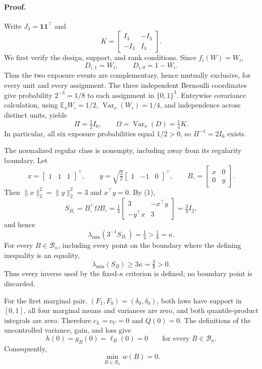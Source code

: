 \paragraph{Proof.}
Write \(J_3=\mathbf 1\mathbf 1^{\top}\) and
\[
K=\begin{bmatrix}I_3&-I_3\\-I_3&I_3\end{bmatrix}.
\]
We first verify the design, support, and rank conditions.  Since \(f_i(W)=W_i\),
\[
D_{i,1}=W_i,
\qquad
D_{i,0}=1-W_i.
\]
Thus the two exposure events are complementary, hence mutually exclusive, for every unit and every assignment.  The three independent Bernoulli coordinates give probability \(2^{-3}=1/8\) to each assignment in \(\{0,1\}^3\).  Entrywise covariance calculation, using \(\mathbb E_\nu W_i=1/2\), \(\operatorname{Var}_\nu(W_i)=1/4\), and independence across distinct units, yields
\[
\Pi=\tfrac12 I_6,
\qquad
\Omega=\operatorname{Var}_\nu(D)=\tfrac14K.
\tag{1}
\]
In particular, all six exposure probabilities equal \(1/2>0\), so \(\Pi^{-1}=2I_6\) exists.

The normalized regular class is nonempty, including away from its regularity boundary.  Let
\[
x=\begin{bmatrix}1&1&1\end{bmatrix}^{\top},
\qquad
y=\sqrt{\tfrac32}\begin{bmatrix}1&-1&0\end{bmatrix}^{\top},
\qquad
B_\circ=\begin{bmatrix}x&0\\0&y\end{bmatrix}.
\]
Then \(\lVert x\rVert_2^2=\lVert y\rVert_2^2=3\) and \(x^{\top}y=0\).  By (1),
\[
S_{B_\circ}=B_\circ^{\top}\Omega B_\circ
=\tfrac14\begin{bmatrix}3&-x^{\top}y\\-y^{\top}x&3\end{bmatrix}
=\tfrac34 I_2,
\]
and hence
\[
\lambda_{\min}(3^{-1}S_{B_\circ})=\tfrac14>\tfrac18=\kappa.
\tag{2}
\]
For every \(B\in\mathcal B_\kappa\), including every point on the boundary where the defining inequality is an equality,
\[
\lambda_{\min}(S_B)\ge 3\kappa=\tfrac38>0.
\tag{3}
\]
Thus every inverse used by the fixed-\(\kappa\) criterion is defined; no boundary point is discarded.

For the first marginal pair, \((F_1,F_0)=(\delta_0,\delta_0)\), both laws have support in \([0,1]\), all four marginal means and variances are zero, and both quantile-product integrals are zero.  Therefore \(c_L=c_U=0\) and \(Q(0)=0\).  The definitions of the uncontrolled variance, gain, and loss give
\[
h(0)=g_B(0)=\ell_B(0)=0
\qquad\text{for every }B\in\mathcal B_\kappa.
\]
Consequently,
\[
\min_{B\in\mathcal B_\kappa}w(B)=0.
\tag{4}
\]

